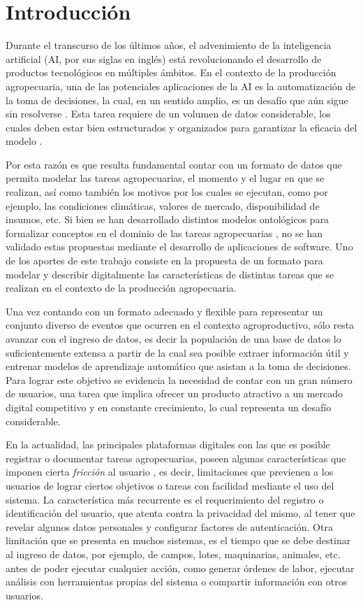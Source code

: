 \section{Introducción}

Durante el transcurso de los últimos años, el advenimiento de la inteligencia artificial (AI, por sus siglas en inglés) está revolucionando el desarrollo de productos tecnológicos en múltiples ámbitos. En el contexto de la producción agropecuaria, una de las potenciales aplicaciones de la AI es la automatización de la toma de decisiones, la cual, en un sentido amplio, es un desafío que aún sigue sin resolverse \cite{ulitin2019,bao2022,schmitt2023}. Esta tarea requiere de un volumen de datos considerable, los cuales deben estar bien estructurados y organizados para garantizar la eficacia del modelo \cite{beleites2013,figueroa2012}. 

Por esta razón es que resulta fundamental contar con un formato de datos que permita modelar las tareas agropecuarias, el momento y el lugar en que se realizan, así como también los motivos por los cuales se ejecutan, como por ejemplo, las condiciones climáticas, valores de mercado, disponibilidad de insumos, etc. Si bien se han desarrollado distintos modelos ontológicos para formalizar conceptos en el dominio de las tareas agropecuarias \cite{abrahao2017,abrahao2018}, no se han validado estas propuestas mediante el desarrollo de aplicaciones de software. Uno de los aportes de este trabajo consiste en la propuesta de un formato para modelar y describir digitalmente las características de distintas tareas que se realizan en el contexto de la producción agropecuaria. 

Una vez contando con un formato adecuado y flexible para representar un conjunto diverso de eventos que ocurren en el contexto agroproductivo, sólo resta avanzar con el ingreso de datos, es decir la populación de una base de datos lo suficientemente extensa a partir de la cual sea posible extraer información útil y entrenar modelos de aprendizaje automático que asistan a la toma de decisiones. Para lograr este objetivo se evidencia la necesidad de contar con un gran número de usuarios, una tarea que implica ofrecer un producto atractivo a un mercado digital competitivo y en constante crecimiento, lo cual representa un desafío considerable. 

En la actualidad, las principales plataformas digitales con las que es posible registrar o documentar tareas agropecuarias, poseen algunas características que imponen cierta \textit{fricción} al usuario \cite{encuesta}, es decir, limitaciones que previenen a los usuarios de lograr ciertos objetivos o tareas con facilidad mediante el uso del sistema. La característica más recurrente es el requerimiento del registro o identificación del usuario, que atenta contra la privacidad del mismo, al tener que revelar algunos datos personales y configurar factores de autenticación. Otra limitación que se presenta en muchos sistemas, es el tiempo que se debe destinar al ingreso de datos, por ejemplo, de campos, lotes, maquinarias, animales, etc. antes de poder ejecutar cualquier acción, como generar órdenes de labor, ejecutar análisis con herramientas propias del sistema o compartir información con otros usuarios.

